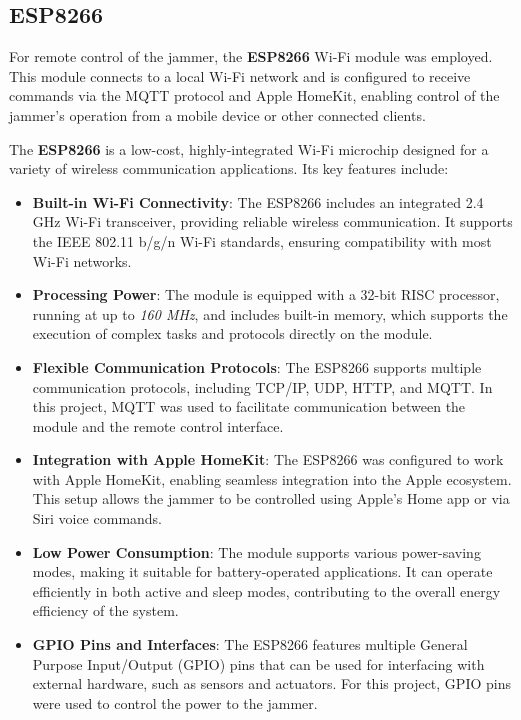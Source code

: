\subsection{ESP8266}

For remote control of the jammer, the \textbf{ESP8266} Wi-Fi module was employed. This module connects to a local Wi-Fi network and is configured to receive commands via the MQTT protocol and Apple HomeKit, enabling control of the jammer's operation from a mobile device or other connected clients.

The \textbf{ESP8266} is a low-cost, highly-integrated Wi-Fi microchip designed for a variety of wireless communication applications. Its key features include:

\begin{itemize}
    \item \textbf{Built-in Wi-Fi Connectivity}: The ESP8266 includes an integrated 2.4 GHz Wi-Fi transceiver, providing reliable wireless communication. It supports the IEEE 802.11 b/g/n Wi-Fi standards, ensuring compatibility with most Wi-Fi networks.
    
    \item \textbf{Processing Power}: The module is equipped with a 32-bit RISC processor, running at up to \textit{160 MHz}, and includes built-in memory, which supports the execution of complex tasks and protocols directly on the module.
    
    \item \textbf{Flexible Communication Protocols}: The ESP8266 supports multiple communication protocols, including TCP/IP, UDP, HTTP, and MQTT. In this project, MQTT was used to facilitate communication between the module and the remote control interface.
    
    \item \textbf{Integration with Apple HomeKit}: The ESP8266 was configured to work with Apple HomeKit, enabling seamless integration into the Apple ecosystem. This setup allows the jammer to be controlled using Apple's Home app or via Siri voice commands.
    
    \item \textbf{Low Power Consumption}: The module supports various power-saving modes, making it suitable for battery-operated applications. It can operate efficiently in both active and sleep modes, contributing to the overall energy efficiency of the system.
    
    \item \textbf{GPIO Pins and Interfaces}: The ESP8266 features multiple General Purpose Input/Output (GPIO) pins that can be used for interfacing with external hardware, such as sensors and actuators. For this project, GPIO pins were used to control the power to the jammer.
\end{itemize}

